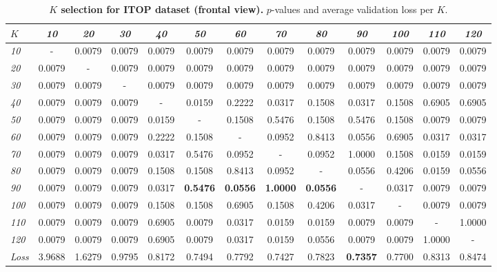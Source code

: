 \documentclass[review,12pt,3p]{elsarticle}
\begin{document}
\begin{table}[t]
\caption{\textbf{$K$ selection for ITOP dataset (frontal view).} $p$-values and average validation loss per $K$.}
\label{tab:statsKiTOPfview}
\scriptsize%
\begin{center}
\setlength{\tabcolsep}{0.2em} %
\begin{tabular}{|l|c c c c c c c c c c c c|}
\hline
 $K$ & \emph{10} & \emph{20}& \emph{30}& \emph{40}& \emph{50}& \emph{60}& \emph{70}& \emph{80}& \emph{90}& \emph{100}& \emph{110}& \emph{120} \\
 \hline
   \emph{10} & - & 0.0079 & 0.0079 & 0.0079 & 0.0079 & 0.0079 & 0.0079 & 0.0079 & 0.0079 & 0.0079 & 0.0079 & 0.0079  \\
   \emph{20} & 0.0079 & - & 0.0079 & 0.0079 & 0.0079 & 0.0079 & 0.0079 & 0.0079 & 0.0079 & 0.0079 & 0.0079 & 0.0079  \\
   \emph{30} & 0.0079 & 0.0079 & - & 0.0079 & 0.0079 & 0.0079 & 0.0079 & 0.0079 & 0.0079 & 0.0079 & 0.0079 & 0.0079  \\
   \emph{40} & 0.0079 & 0.0079 & 0.0079 & - & 0.0159 & 0.2222 & 0.0317 & 0.1508 & 0.0317 & 0.1508 & 0.6905 & 0.6905  \\
   \emph{50} & 0.0079 & 0.0079 & 0.0079 & 0.0159 & - & 0.1508 & 0.5476 & 0.1508 & 0.5476 & 0.1508 & 0.0079 & 0.0079  \\
   \emph{60} & 0.0079 & 0.0079 & 0.0079 & 0.2222 & 0.1508 & - & 0.0952 & 0.8413 & 0.0556 & 0.6905 & 0.0317 & 0.0317  \\
   \emph{70} & 0.0079 & 0.0079 & 0.0079 & 0.0317 & 0.5476 & 0.0952 & - & 0.0952 & 1.0000 & 0.1508 & 0.0159 & 0.0159  \\
   \emph{80} & 0.0079 & 0.0079 & 0.0079 & 0.1508 & 0.1508 & 0.8413 & 0.0952 & - & 0.0556 & 0.4206 & 0.0159 & 0.0556  \\
   \emph{90} & 0.0079 & 0.0079 & 0.0079 & 0.0317 & \textbf{0.5476} & \textbf{0.0556} & \textbf{1.0000} & \textbf{0.0556} & - & 0.0317 & 0.0079 & 0.0079  \\
   \emph{100} & 0.0079 & 0.0079 & 0.0079 & 0.1508 & 0.1508 & 0.6905 & 0.1508 & 0.4206 & 0.0317 & - & 0.0079 & 0.0079  \\
   \emph{110} & 0.0079 & 0.0079 & 0.0079 & 0.6905 & 0.0079 & 0.0317 & 0.0159 & 0.0159 & 0.0079 & 0.0079 & - & 1.0000  \\
   \emph{120} & 0.0079 & 0.0079 & 0.0079 & 0.6905 & 0.0079 & 0.0317 & 0.0159 & 0.0556 & 0.0079 & 0.0079 & 1.0000 & -  \\
\hline 
\hline
\textit{Loss} & 3.9688  &  1.6279  &0.9795 &   0.8172  &  0.7494&    0.7792&    0.7427&    0.7823 &   \textbf{0.7357} &    0.7700    &0.8313    &0.8474\\
\hline
\end{tabular} 
\end{center}
\end{table}
\end{document}
